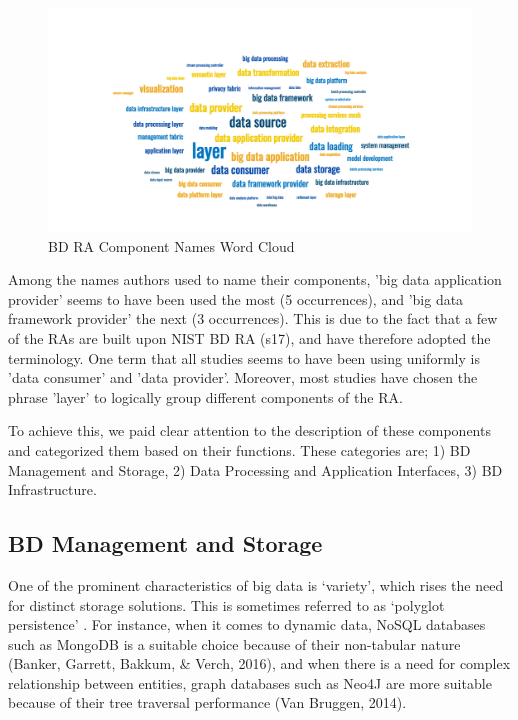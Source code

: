 \documentclass{ieeeaccess}
\begin{document}
\begin{figure}[h]
    \includegraphics[width=18cm]{wordcloud.png}
    \caption{BD RA Component Names Word Cloud}
    \label{image:word-cloud}
\end{figure}

Among the names authors used to name their components, 'big data application provider' seems to have been used the most (5 occurrences), and 'big data framework provider' the next (3 occurrences). This is due to the fact  that a few of the RAs are built upon NIST BD RA (s17), and have therefore adopted the terminology. One term that all studies seems to have been using uniformly is 'data consumer' and 'data provider'. Moreover, most studies have chosen the phrase 'layer' to logically group different components of the RA.

To achieve this, we paid clear attention to the description of these components and categorized them based on their functions. These categories are; 1) BD Management and Storage, 2) Data Processing and Application Interfaces, 3) BD Infrastructure.

\subsection{BD Management and Storage}

One of the prominent characteristics of big data is ‘variety’, which rises the need for distinct storage solutions. This is sometimes referred to as ‘polyglot persistence’ \cite{khine2019review}. For instance, when it comes to dynamic data, NoSQL databases such as MongoDB is a suitable choice because of their non-tabular nature (Banker, Garrett, Bakkum, \& Verch, 2016), and when there is a need for complex relationship between entities, graph databases such as Neo4J are more suitable because of their tree traversal performance (Van Bruggen, 2014). 
\end{document}
